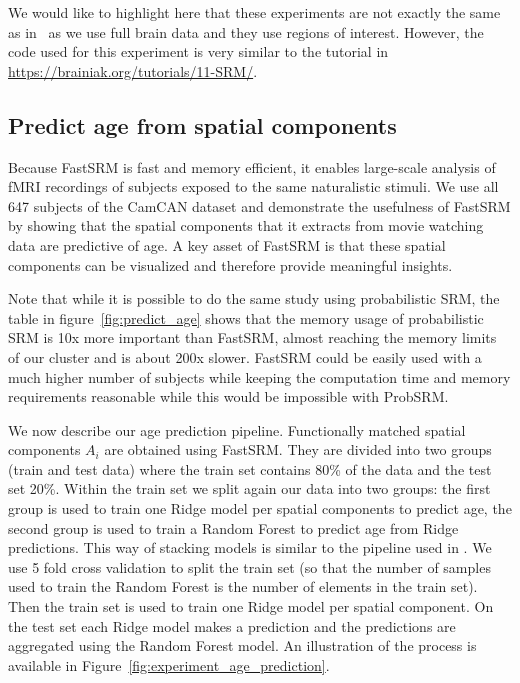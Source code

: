 We would like to highlight here that these experiments are not exactly the same
as in~\cite{chen2015reduced} as we use full brain data and they use regions of
interest. However, the code used for this experiment is very similar to the tutorial in \url{https://brainiak.org/tutorials/11-SRM/}.

\subsection{Predict age from spatial components}
Because FastSRM is fast and memory efficient, it enables large-scale analysis of fMRI recordings of subjects exposed to the same naturalistic stimuli.
% 
We use all 647 subjects of the CamCAN dataset and demonstrate the usefulness of FastSRM by showing that the spatial components that it extracts from movie watching data are predictive of age.
% 
A key asset of FastSRM is that these spatial components can be visualized and therefore provide meaningful insights. 

Note that while it is possible to do the same study using probabilistic SRM, the
table in figure~\ref{fig:predict_age} shows that the memory usage of
probabilistic SRM is 10x more important than FastSRM, almost reaching the memory
limits of our cluster and is about 200x slower. FastSRM could be
easily used with a much higher number of subjects while keeping the computation
time and memory requirements reasonable while this would be impossible with ProbSRM.

We now describe our age prediction pipeline.
Functionally matched spatial components $A_i$ are obtained using FastSRM.
%
They are divided into two groups (train and test data) where the train set contains 80\% of the data and the test set 20\%.
%
Within the train set we split again our data into two groups: the first group is
used to train one Ridge model per spatial components to predict age, the second group is used to train a Random Forest to predict age from Ridge predictions. This way of stacking models is similar to the pipeline used in \cite{rahim2017joint}.
%
We use 5 fold cross validation to split the train set (so that the number of samples used to train the Random Forest is the number of elements in the train set).
%
Then the train set is used to train one Ridge model per spatial component.
%
On the test set each Ridge model makes a prediction and the predictions are aggregated using the Random Forest model.
%
An illustration of the process is available in Figure~\ref{fig:experiment_age_prediction}. 

